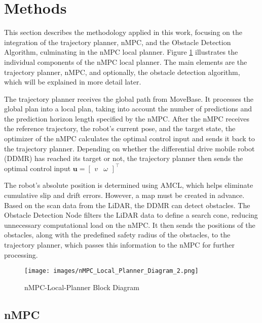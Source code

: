 \documentclass[conference]{IEEEtran}
\begin{document}
\section{Methods}

This section describes the methodology applied in this work, focusing on the integration of the trajectory planner, nMPC, and the Obstacle Detection Algorithm, culminating in the nMPC local planner. Figure \ref{fig:nMPC_Local_Planner_Diagram_2} illustrates the individual components of the nMPC local planner. The main elements are the trajectory planner, nMPC, and optionally, the obstacle detection algorithm, which will be explained in more detail later.

The trajectory planner receives the global path from MoveBase. It processes the global plan into a local plan, taking into account the number of predictions and the prediction horizon length specified by the nMPC. After the nMPC receives the reference trajectory, the robot’s current pose, and the target state, the optimizer of the nMPC calculates the optimal control input and sends it back to the trajectory planner. Depending on whether the differential drive mobile robot (DDMR) has reached its target or not, the trajectory planner then sends the optimal control input \(\mathbf{u} = \begin{bmatrix} v & \omega \end{bmatrix}^\top\)

The robot's absolute position is determined using AMCL, which helps eliminate cumulative slip and drift errors. However, a map must be created in advance. Based on the scan data from the LiDAR, the DDMR can detect obstacles. The Obstacle Detection Node filters the LiDAR data to define a search cone, reducing unnecessary computational load on the nMPC. It then sends the positions of the obstacles, along with the predefined safety radius of the obstacles, to the trajectory planner, which passes this information to the nMPC for further processing.

\begin{figure}[!h]
    \centering
    \texttt{[image: images/nMPC\_Local\_Planner\_Diagram\_2.png]}
    \caption{nMPC-Local-Planner Block Diagram }
    \label{fig:nMPC_Local_Planner_Diagram_2}
\end{figure}


\subsection{nMPC}
\end{document}
